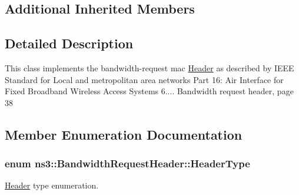 \subsection*{Additional Inherited Members}


\subsection{Detailed Description}
This class implements the bandwidth-\/request mac \hyperlink{classns3_1_1Header}{Header} as described by I\+E\+EE Standard for Local and metropolitan area networks Part 16\+: Air Interface for Fixed Broadband Wireless Access Systems 6.... Bandwidth request header, page 38 

\subsection{Member Enumeration Documentation}
\subsubsection[{\texorpdfstring{Header\+Type}{HeaderType}}]{\setlength{\rightskip}{0pt plus 5cm}enum {\bf ns3\+::\+Bandwidth\+Request\+Header\+::\+Header\+Type}}\hypertarget{classns3_1_1BandwidthRequestHeader_abbaf4abd8f160828930369dff9a3d657}{}\label{classns3_1_1BandwidthRequestHeader_abbaf4abd8f160828930369dff9a3d657}


\hyperlink{classns3_1_1Header}{Header} type enumeration. 

